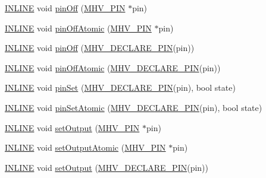 \begin{DoxyCompactItemize}
\item 
\hyperlink{io_8h_a2eb6f9e0395b47b8d5e3eeae4fe0c116}{I\-N\-L\-I\-N\-E} void \hyperlink{namespacemhvlib_a5b7f534da76c990f21f9328c3a4bd684}{pin\-Off} (\hyperlink{namespacemhvlib_a3fc44352ee2826fe480452ba1acd5de7}{M\-H\-V\-\_\-\-P\-I\-N} $\ast$pin)
\item 
\hyperlink{io_8h_a2eb6f9e0395b47b8d5e3eeae4fe0c116}{I\-N\-L\-I\-N\-E} void \hyperlink{namespacemhvlib_aa20d054715ba9797f1bf8e91023b873a}{pin\-Off\-Atomic} (\hyperlink{namespacemhvlib_a3fc44352ee2826fe480452ba1acd5de7}{M\-H\-V\-\_\-\-P\-I\-N} $\ast$pin)
\item 
\hyperlink{io_8h_a2eb6f9e0395b47b8d5e3eeae4fe0c116}{I\-N\-L\-I\-N\-E} void \hyperlink{namespacemhvlib_aa4b0bb1f68c452e4af07f59eafcc5dcc}{pin\-Off} (\hyperlink{io_8h_afb172d17be3890bb07e5ceec5a014b91}{M\-H\-V\-\_\-\-D\-E\-C\-L\-A\-R\-E\-\_\-\-P\-I\-N}(pin))
\item 
\hyperlink{io_8h_a2eb6f9e0395b47b8d5e3eeae4fe0c116}{I\-N\-L\-I\-N\-E} void \hyperlink{namespacemhvlib_ab9ef7a264c4b1fd4bbe6b0ca53bb4f99}{pin\-Off\-Atomic} (\hyperlink{io_8h_afb172d17be3890bb07e5ceec5a014b91}{M\-H\-V\-\_\-\-D\-E\-C\-L\-A\-R\-E\-\_\-\-P\-I\-N}(pin))
\item 
\hyperlink{io_8h_a2eb6f9e0395b47b8d5e3eeae4fe0c116}{I\-N\-L\-I\-N\-E} void \hyperlink{namespacemhvlib_aec269d191ce7075adc141333b3847291}{pin\-Set} (\hyperlink{io_8h_afb172d17be3890bb07e5ceec5a014b91}{M\-H\-V\-\_\-\-D\-E\-C\-L\-A\-R\-E\-\_\-\-P\-I\-N}(pin), bool state)
\item 
\hyperlink{io_8h_a2eb6f9e0395b47b8d5e3eeae4fe0c116}{I\-N\-L\-I\-N\-E} void \hyperlink{namespacemhvlib_a45fd142a5d3f644b383d7279923ba331}{pin\-Set\-Atomic} (\hyperlink{io_8h_afb172d17be3890bb07e5ceec5a014b91}{M\-H\-V\-\_\-\-D\-E\-C\-L\-A\-R\-E\-\_\-\-P\-I\-N}(pin), bool state)
\item 
\hyperlink{io_8h_a2eb6f9e0395b47b8d5e3eeae4fe0c116}{I\-N\-L\-I\-N\-E} void \hyperlink{namespacemhvlib_af936e2d4e6ee2af485963f51673edce7}{set\-Output} (\hyperlink{namespacemhvlib_a3fc44352ee2826fe480452ba1acd5de7}{M\-H\-V\-\_\-\-P\-I\-N} $\ast$pin)
\item 
\hyperlink{io_8h_a2eb6f9e0395b47b8d5e3eeae4fe0c116}{I\-N\-L\-I\-N\-E} void \hyperlink{namespacemhvlib_a1722d67db891bfae9f55c4ccea9a6375}{set\-Output\-Atomic} (\hyperlink{namespacemhvlib_a3fc44352ee2826fe480452ba1acd5de7}{M\-H\-V\-\_\-\-P\-I\-N} $\ast$pin)
\item 
\hyperlink{io_8h_a2eb6f9e0395b47b8d5e3eeae4fe0c116}{I\-N\-L\-I\-N\-E} void \hyperlink{namespacemhvlib_a628b389f15647af4f050065c2a405c9b}{set\-Output} (\hyperlink{io_8h_afb172d17be3890bb07e5ceec5a014b91}{M\-H\-V\-\_\-\-D\-E\-C\-L\-A\-R\-E\-\_\-\-P\-I\-N}(pin))

\end{DoxyCompactItemize}
